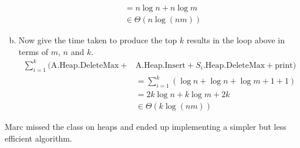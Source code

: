 \documentclass[12pt]{article}
\begin{document}
\begin{enumerate}[(a)]
\begin{align*}
&= n\log n + n\log m\\
& \in \Theta(n\log(nm))
\end{align*}
\item  Now give the time taken
to produce the top $k$ results in the loop above in terms of $m$, $n$ and $k$.
\begin{align*}
\displaystyle\sum_{i=1}^k \bigg (\text{A.Heap.DeleteMax} + &\text{A.Heap.Insert} + \text{$S_i$.Heap.DeleteMax} + \text{print} \bigg ) \\
&= \displaystyle\sum_{i=1}^k (\log n + \log n + \log m + 1 +1 )\\
&= 2k\log n + k\log m + 2k\\
&\in \Theta(k\log(nm))
\end{align*}
\setcounter{saveenum}{\value{enumi}}
\end{enumerate}
Marc missed the class on heaps and ended up implementing a simpler but less efficient
algorithm.
\end{document}

